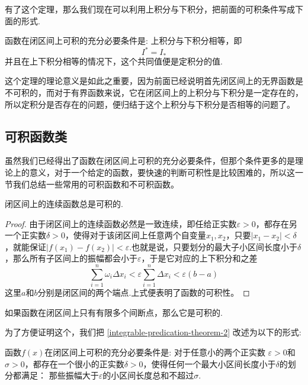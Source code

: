 有了这个定理，那么我们现在可以利用上积分与下积分，把前面的可积条件写成下面的形式.
\begin{theorem}
  函数在闭区间上可积的充分必要条件是: 上积分与下积分相等，即
  \[ I^{*} = I_{*} \]
  并且在上下积分相等的情况下，这个共同值便是定积分的值.
\end{theorem}

这个定理的理论意义是如此之重要，因为前面已经说明首先闭区间上的无界函数是不可积的，而对于有界函数来说，它在闭区间上的上积分与下积分是一定存在的，所以定积分是否存在的问题，便归结于这个上积分与下积分是否相等的问题了。

\subsection{可积函数类}
\label{sec:integrable-and-not-function}

虽然我们已经得出了函数在闭区间上可积的充分必要条件，但那个条件更多的是理论上的意义，对于一个给定的函数，要快速的判断可积性是比较困难的，所以这一节我们总结一些常用的可积函数和不可积函数。

\begin{theorem}
  闭区间上的连续函数总是可积的.
\end{theorem}

\begin{proof}
  由于闭区间上的连续函数必然是一致连续，即任给正实数$\varepsilon>0$，都存在另一个正实数$\delta>0$，使得对于该闭区间上任意两个自变量$x_1,x_2$，只要$|x_1-x_2|<\delta$，就能保证$|f(x_1)-f(x_2)|<\varepsilon$.也就是说，只要划分的最大子小区间长度小于$\delta$，那么所有子区间上的振幅都会小于$\varepsilon$，于是它对应的上下积分和之差
  \[ \sum_{i=1}^n \omega_i \Delta x_i < \varepsilon \sum_{i=1}^n \Delta x_i < \varepsilon (b-a) \]
  这里$a$和$b$分别是闭区间的两个端点.上式便表明了函数的可积性。
\end{proof}

\begin{theorem}
  如果函数在闭区间上只有有限多个间断点，那么它是可积的.
\end{theorem}

为了方便证明这个，我们把 \autoref{integrable-predication-theorem-2} 改述为以下的形式:
\begin{theorem}
  \label{integrable-predication-theorem-3}
  函数$f(x)$在闭区间上可积的充分必要条件是: 对于任意小的两个正实数 $\varepsilon>0$和$\sigma>0$，都存在一个很小的正实数$\delta>0$，使得任何一个最大小区间长度小于$\delta$的划分都满足： 那些振幅大于$\varepsilon$的小区间长度总和不超过$\sigma$.
\end{theorem}

